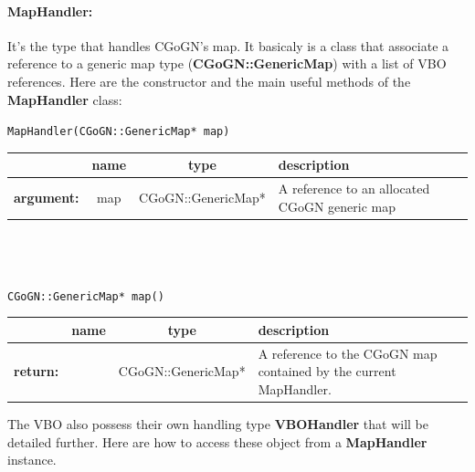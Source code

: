 \documentclass[a4paper]{scrreprt}
\begin{document}
	\paragraph{MapHandler:}
	It's the type that handles CGoGN's map. It basicaly is a class that associate a
	reference to a generic map type (\textbf{CGoGN::GenericMap}) with a list of VBO
	references. Here are the constructor and the main useful methods of the
	\textbf{MapHandler} class:
	\begin{center}
		\texttt{MapHandler(CGoGN::GenericMap* map)}
	\begin{tabular}{|l|c|c|p{}|}
		\hline
		~ & name & type & description
		\\ \hline
		\textbf{argument:} & map & CGoGN::GenericMap* &
			A reference to an allocated CGoGN generic map
		\\ \hline
	\end{tabular}
	\\~\\~\\
		\texttt{CGoGN::GenericMap* map()}
	\begin{tabular}{|l|c|c|p{}|}
		\hline
		~ & name & type & description
		\\ \hline
		\textbf{return:} & ~ & CGoGN::GenericMap* &
			A reference to the CGoGN map contained by the current MapHandler.
		\\ \hline
	\end{tabular}
	\end{center}
	The VBO also possess their own handling type \textbf{VBOHandler} that will be
	detailed further. Here are how to access these object from a
	\textbf{MapHandler} instance.
\end{document}
